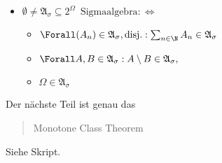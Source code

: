 \begin{solution}
\begin{itemize}
  \item $\emptyset \neq \mathfrak{A}_\sigma \subseteq 2^\Omega \enspace \text{Sigmaalgebra} : \Leftrightarrow$
  \begin{itemize}
    \item $\Forall (A_n) \in \mathfrak{A}_\sigma, \text{disj.}: \sum_{n \in \N} A_n \in \mathfrak{A}_\sigma$
    \item $\Forall A, B \in \mathfrak{A}_\sigma: A \setminus B \in \mathfrak{A}_\sigma,$
    \item $\Omega \in \mathfrak{A}_\sigma$
  \end{itemize}

\end{itemize}

Der nächste Teil ist genau das \blockquote{Monotone Class Theorem}! Siehe Skript.

\end{solution}

